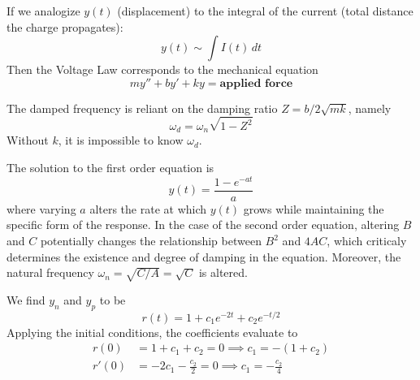 \documentclass[a4paper]{article}
\begin{document}
If we analogize \( y \!\left( t  \right) \) (displacement) to the integral of the current (total distance the charge propagates):
\[
	y \!\left( t  \right) \sim \int I \!\left( t  \right) \, dt
\]
Then the Voltage Law corresponds to the mechanical equation
\[
	my'' + by' + ky = \textbf{applied force} 
\]


The damped frequency is reliant on the damping ratio \( Z = b / 2 \sqrt{mk} \), namely
\[
	\omega_{d } = \omega_{n } \sqrt{1- Z^{2}} 
\]
Without \( k \), it is impossible to know \( \omega_{d } \).

\vspace{12pt}


The solution to the first order equation is
\[
	y \!\left( t  \right) =\frac{1 - e^{-at }}{a } 
\]
where varying \( a \) alters the rate at which \( y \!\left( t  \right) \) grows while maintaining the specific form of the response. In the case of the second order equation, altering \( B  \) and \( C  \) potentially changes the relationship between \( B^{2} \) and \( 4AC \), which criticaly determines the existence and degree of damping in the equation. Moreover, the natural frequency \( \omega_{n } = \sqrt{C/A } = \sqrt{C } \) is altered.

\vspace{12pt}


We find \( y_{n } \) and \( y_{p } \) to be
\[
	 r \!\left( t  \right) = 1 + c_{1}e^{-2t } + c_{2}e^{-t/2}
\]
Applying the initial conditions, the coefficients evaluate to
\begin{align*}
	r \!\left( 0 \right) & = 1 + c_{1} + c_{2} = 0 \implies \boxed{c_{1} = -\!\left( 1 + c_{2} \right)} \\
	r'\!\left( 0 \right) & = -2c_{1} - \frac{c_{2}}{2} = 0 \implies \boxed{c_{1} = -\frac{c_{2}}{4}} \\ 
\end{align*}
\end{document}
